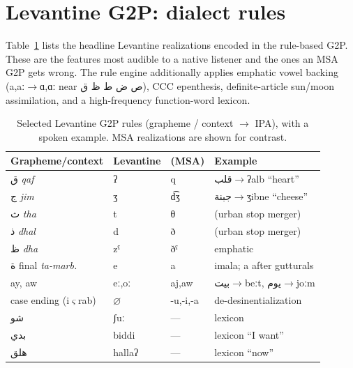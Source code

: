 \documentclass[10pt,twocolumn]{article}
\newcommand{\ipa}[1]{{\ipafont #1}}
\newcommand{\ar}[1]{{\arabicfont #1}}
\begin{document}
\onecolumn
\appendix
\section{Levantine G2P: dialect rules}
\label{app:g2p}
Table~\ref{tab:g2p} lists the headline Levantine realizations encoded in the rule-based G2P.
These are the features most audible to a native listener and the ones an MSA G2P gets wrong.
The rule engine additionally applies emphatic vowel backing
(\ipa{a,aː}\(\rightarrow\)\ipa{ɑ,ɑː} near \ar{ص ض ط ظ ق}), CCC epenthesis, definite-article
sun/moon assimilation, and a high-frequency function-word lexicon.

\begin{table}[h]
\centering\small
\caption{Selected Levantine G2P rules (grapheme / context \(\rightarrow\) IPA), with a spoken
example. MSA realizations are shown for contrast.}
\label{tab:g2p}
\begin{tabular}{llll}
\toprule
\textbf{Grapheme/context} & \textbf{Levantine} & \textbf{(MSA)} & \textbf{Example}\\
\midrule
\ar{ق} \emph{qaf}            & \ipa{ʔ} & \ipa{q}   & \ar{قلب}\(\rightarrow\)\ipa{ʔalb} ``heart''\\
\ar{ج} \emph{jim}            & \ipa{ʒ} & \ipa{d͡ʒ} & \ar{جبنة}\(\rightarrow\)\ipa{ʒibne} ``cheese''\\
\ar{ث} \emph{tha}            & \ipa{t} & \ipa{θ}   & (urban stop merger)\\
\ar{ذ} \emph{dhal}           & \ipa{d} & \ipa{ð}   & (urban stop merger)\\
\ar{ظ} \emph{dha}            & \ipa{zˤ}& \ipa{ðˤ}  & emphatic\\
\ar{ة} final \emph{ta-marb.} & \ipa{e} & \ipa{a}   & imala; \ipa{a} after gutturals\\
\ipa{ay}, \ipa{aw}           & \ipa{eː},\ipa{oː} & \ipa{aj},\ipa{aw} & \ar{بيت}\(\rightarrow\)\ipa{beːt}, \ar{يوم}\(\rightarrow\)\ipa{joːm}\\
case ending (i\(\varsigma\)rab)& \(\varnothing\) & \ipa{-u,-i,-a} & de-desinentialization\\
\ar{شو}                       & \ipa{ʃuː} & --- & lexicon\\
\ar{بدي}                      & \ipa{biddi} & --- & lexicon ``I want''\\
\ar{هلق}                      & \ipa{hallaʔ} & --- & lexicon ``now''\\
\bottomrule
\end{tabular}
\end{table}
\end{document}
